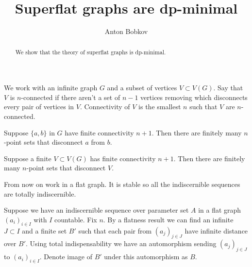 \documentclass{amsart}
\begin{document}
\title{Superflat graphs are dp-minimal}
\author{Anton Bobkov}

\begin{abstract}
	We show that the theory of superflat graphs is dp-minimal.
\end{abstract}

\maketitle

We work with an infinite graph $G$ and a subset of vertices $V \subset V(G)$. Say that $V$ is $n$-connected if there aren't a set of $n-1$ vertices removing which disconnects every pair of vertices in $V$. Connectivity of $V$ is the smallest $n$ such that $V$ are $n$-connected.

\begin{Lemma}
	Suppose $\{a,b\}$ in $G$ have finite connectivity $n+1$. Then there are finitely many $n$-point sets that disconnect $a$ from $b$.
\end{Lemma}

\begin{Corollary}
	Suppose a finite $V \subset V(G)$ has finite connectivity $n+1$. Then there are finitely many $n$-point sets that disconnect $V$.
\end{Corollary}

From now on work in a flat graph. It is stable so all the indiscernible sequences are totally indiscernible.

Suppose we have an indiscernible sequence over parameter set $A$ in a flat graph $(a_i)_{i \in I}$ with $I$ countable. Fix $n$. By a flatness result we can find an infinite $J \subset I$ and a finite set $B'$ such that each pair from $(a_j)_{j \in J}$ have infinite distance over $B'$. Using total indispensability we have an automorphism sending $(a_j)_{j \in J}$ to $(a_i)_{i \in I}$. Denote image of $B'$ under this automorphism as $B$. 
\end{document}
